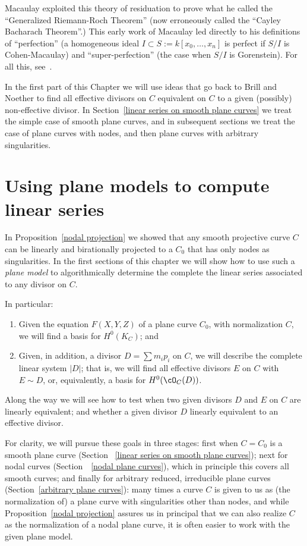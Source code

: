 Macaulay exploited this theory of residuation  to prove what he called the ``Generalized Riemann-Roch Theorem'' (now erroneously called the ``Cayley Bacharach Theorem''.) This early work of Macaulay led directly to his definitions of  ``perfection'' (a homogeneous ideal
$I  \subset S:= k[x_0, \dots, x_n]$ is perfect if $S/I$ is Cohen-Macaulay) and ``super-perfection'' (the case when $S/I$ is
Gorenstein). For all this, see~\cite{Eisenbud-Gray}.

In the first part of this Chapter we will use ideas that go back to Brill and Noether to find all effective divisors on $C$ equivalent on $C$ to a given (possibly) non-effective divisor. In Section~\ref{linear series on smooth plane curves} we treat the simple case of smooth plane curves, and in subsequent sections we treat the case of plane curves with nodes, and then plane curves with arbitrary singularities.

 
\section{Using plane models to compute linear series} \label{computing linear series}

In Proposition~\ref{nodal projection} we showed that any smooth projective curve $C$ can be linearly and birationally projected to a $C_0$ that has only nodes as singularities. In the first sections of this chapter we will show how to use such a \emph{plane model} to algorithmically determine the complete the linear series associated to any divisor on $C$.

In particular:
\begin{enumerate}
\item Given the equation $F(X,Y,Z)$ of a plane curve $C_0$, with normalization $C$, we will find a basis for $H^0(K_C)$; and
\item  Given, in addition, a divisor $D = \sum m_ip_i$ on $C$, we will describe the complete linear system $|D|$; that is, we will find all effective divisors $E$ on $C$ with $E \sim D$, or, equivalently, a basis for $H^0(\cO_C(D))$.
\end{enumerate}

Along the way we will see how to test when two given divisors $D$ and $E$ on $C$ are linearly equivalent; and whether a given divisor $D$ linearly equivalent to an effective divisor.

For clarity, we will pursue these goals in three stages: first when $C = C_0$ is a smooth plane curve (Section~ \ref{linear series on smooth plane curves}); next for nodal curves (Section~~\ref{nodal plane curves}), which in principle this covers all smooth curves; and finally for arbitrary reduced, irreducible plane curves (Section~\ref{arbitrary plane curves}): many times a curve $C$ is given to us as (the normalization of) a plane curve with singularities other than nodes, and while Proposition~\ref{nodal projection} assures us in principal that we can also realize $C$ as the normalization of a nodal plane curve, it is often easier to work with the given plane model. 

